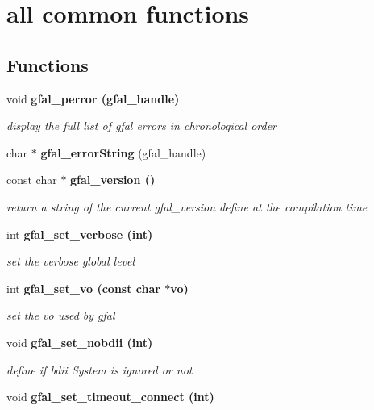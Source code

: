 \section{all common functions}
\label{group__common__group}
\subsection*{Functions}
\begin{CompactItemize}
\item 
void \bf{gfal\_\-perror} (gfal\_\-handle)\label{group__common__group_g21dc4cf2faa139b5813429eefb0c317a}

\begin{CompactList}\small\item\em display the full list of gfal errors in chronological order \item\end{CompactList}\item 
char $\ast$ \textbf{gfal\_\-error\-String} (gfal\_\-handle)\label{group__common__group_gb761574eb723a9c07a932cabec4f2426}

\item 
const char $\ast$ \bf{gfal\_\-version} ()\label{group__common__group_ga5a8df616e6a5e6fc1d94e2374c7ccf2}

\begin{CompactList}\small\item\em return a string of the current gfal\_\-version define at the compilation time \item\end{CompactList}\item 
int \bf{gfal\_\-set\_\-verbose} (int)
\begin{CompactList}\small\item\em set the verbose global level \item\end{CompactList}\item 
int \bf{gfal\_\-set\_\-vo} (const char $\ast$vo)\label{group__common__group_gcf4ae9045b7e5a2a697b1bb1f05994a8}

\begin{CompactList}\small\item\em set the vo used by gfal \item\end{CompactList}\item 
void \bf{gfal\_\-set\_\-nobdii} (int)
\begin{CompactList}\small\item\em define if bdii System is ignored or not \item\end{CompactList}\item 
void \bf{gfal\_\-set\_\-timeout\_\-connect} (int)\label{group__common__group_g62f544258aa58af5122f40f0eb1a7c92}


\end{CompactItemize}

